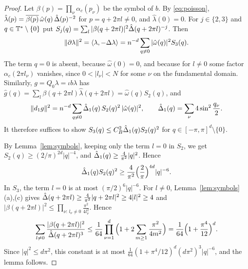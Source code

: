 \begin{proof}
Let $\beta(p)=\prod_\nu\alpha_c(p_\nu)$ be the symbol of $b$. By \eqref{eq:poisson}, $\hat\lambda(p)=\overline{\beta(p)}\,\hat\omega(q)\,\hat{\Delta}(p)^{-2}$ for $p=q+2\pi l\ne0$, and $\hat\lambda(0)=0$. For $j\in\{2,3\}$ and $q\in\mathbb T^*\setminus\{0\}$ put $S_j(q)=\sum_l|\beta(q+2\pi l)|^2\hat{\Delta}(q+2\pi l)^{-j}$. Then
\[
\|\partial\lambda\|^2=\langle \lambda,-\Delta\lambda\rangle=n^{-d}\sum_{q\ne0}|\hat\omega(q)|^2S_3(q).
\]
The term $q=0$ is absent, because $\hat\omega(0)=0$, and because for $l\ne0$ some factor $\alpha_c(2\pi l_\nu)$ vanishes, since $0<|l_\nu|<N$ for some $\nu$ on the fundamental domain. Similarly, $g=Q_0\lambda=\iota b\lambda$ has $\hat g(q)=\sum_l\beta(q+2\pi l)\hat\lambda(q+2\pi l)=\hat\omega(q)S_2(q)$, and
\[
\|d_1 g\|^2=n^{-d}\sum_{q\ne0}\hat{\Delta}_1(q)\,S_2(q)^2\,|\hat\omega(q)|^2,\qquad \hat{\Delta}_1(q)=\sum_\nu4\sin^2\frac{q_\nu}2 .
\]
It therefore suffices to show $S_3(q)\le C_B^2\hat{\Delta}_1(q)S_2(q)^2$ for $q\in[-\pi,\pi]^d\setminus\{0\}$.

By Lemma~\ref{lem:symbols}, keeping only the term $l=0$ in $S_2$, we get $S_2(q)\ge(2/\pi)^{2d}|q|^{-4}$, and $\hat{\Delta}_1(q)\ge\frac4{\pi^2}|q|^2$. Hence
\[
\hat{\Delta}_1(q)S_2(q)^2\ge\frac4{\pi^2}\Big(\frac2\pi\Big)^{4d}|q|^{-6}.
\]
In $S_3$, the term $l=0$ is at most $(\pi/2)^6|q|^{-6}$. For $l\ne0$, Lemma~\ref{lem:symbols}(a),(c) gives $\hat{\Delta}(q+2\pi l)\ge\frac4{\pi^2}|q+2\pi l|^2\ge4|l|^2\ge4$ and $|\beta(q+2\pi l)|^2\le\prod_{\nu:\,l_\nu\ne0}\frac{\pi^2}{4l_\nu^2}$. Hence
\[
\sum_{l\ne0}\frac{|\beta(q+2\pi l)|^2}{\hat{\Delta}(q+2\pi l)^3}\le\frac1{64}\prod_{\nu=1}^d\Big(1+2\sum_{m\ge1}\frac{\pi^2}{4m^2}\Big)=\frac1{64}\Big(1+\frac{\pi^4}{12}\Big)^d .
\]
Since $|q|^2\le d\pi^2$, this constant is at most $\frac1{64}(1+\pi^4/12)^d(d\pi^2)^3|q|^{-6}$, and the lemma follows.
\end{proof}
